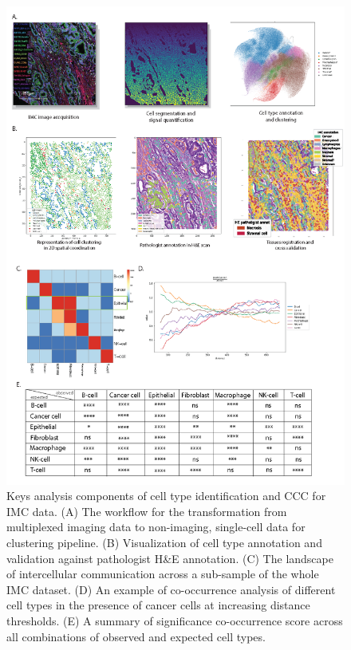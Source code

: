 \begin{figure}
    \centering
    \includegraphics[width=0.8\columnwidth]{Chapter3/Figures/Hyperion_analysis_results-01.png}
    \caption{Keys analysis components of cell type identification and CCC for IMC data. (A) The workflow for the transformation from multiplexed imaging data to non-imaging, single-cell data for clustering pipeline. (B) Visualization of cell type annotation and validation against pathologist H\&E annotation. (C) The landscape of intercellular communication across a sub-sample of the whole IMC dataset. (D) An example of co-occurrence analysis of different cell types in the presence of cancer cells at increasing distance thresholds. (E) A summary of significance co-occurrence score across all combinations of observed and expected cell types.}
    \label{fig:colorectal_cancer_IMC}
    
\end{figure}
